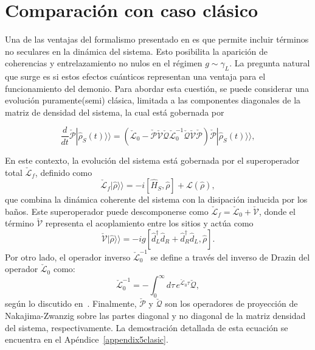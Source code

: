 \label{sec5:demonio1}

\newpage 

\section{Comparación con caso clásico}
Una de las ventajas del formalismo presentado en \cite{potts2021thermodynamically} es que permite incluir términos no seculares en la dinámica del sistema. Esto posibilita la aparición de coherencias y entrelazamiento no nulos en el régimen \( g \sim \gamma_{L} \). La pregunta natural que surge es si estos efectos cuánticos representan una ventaja para el funcionamiento del demonio. Para abordar esta cuestión, se puede considerar una evolución puramente(semi) clásica, limitada a las componentes diagonales de la matriz de densidad del sistema, la cual está gobernada por

\begin{equation}
    \frac{d}{dt}\check{\mathcal{P}}|\hat{\rho}_{S}(t)\rangle \rangle = (\check{\mathcal{L}}_{0} - \check{\mathcal{P}}\check{\mathcal{V}}\check{\mathcal{Q}}\check{\mathcal{L}}^{-1}_{0}\check{\mathcal{Q}}\check{\mathcal{V}}\check{\mathcal{P}})\check{\mathcal{P}}|\hat{\rho}_{S}(t)\rangle \rangle, 
\label{ec5:classicalmodel}
\end{equation}

En este contexto, la evolución del sistema está gobernada por el superoperador total $\check{\mathcal{L}}_{f}$, definido como
\begin{equation*}
\check{\mathcal{L}}_{f}|\hat{\rho}\rangle\rangle = -i[\hat{H}_{S}, \hat{\rho}] + \mathcal{L}(\hat{\rho}),
\end{equation*}
que combina la dinámica coherente del sistema con la disipación inducida por los baños. Este superoperador puede descomponerse como $\check{\mathcal{L}}_{f} = \check{\mathcal{L}}_{0} + \check{\mathcal{V}}$, donde el término $\check{\mathcal{V}}$ representa el acoplamiento entre los sitios y actúa como
\begin{equation*}
\check{\mathcal{V}}|\hat{\rho}\rangle\rangle = -ig[\hat{d}_{L}^{\dagger} \hat{d}_{R} + \hat{d}_{R}^{\dagger} \hat{d}_{L}, \hat{\rho}].
\end{equation*}
Por otro lado, el operador inverso $\check{\mathcal{L}}_{0}^{-1}$ se define a través del inverso de Drazin del operador $\check{\mathcal{L}}_{0}$ como:
\begin{equation*}
\check{\mathcal{L}}_{0}^{-1} = -\int_{0}^{\infty} d\tau\, e^{\check{\mathcal{L}}_{0} \tau} \check{\mathcal{Q}},
\end{equation*}
según lo discutido en~\cite{landi2024current}. Finalmente, $\check{\mathcal{P}}$ y $\check{\mathcal{Q}}$ son los operadores de proyección de Nakajima-Zwanzig sobre las partes diagonal y no diagonal de la matriz densidad del sistema, respectivamente. La demostración detallada de esta ecuación se encuentra en el Apéndice~\ref{appendix5clasic}.

